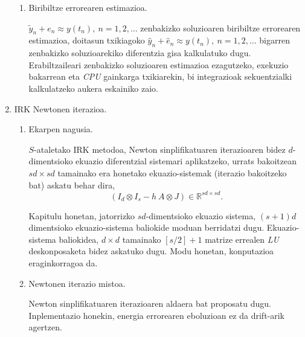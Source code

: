 \begin{enumerate}
\begin{enumerate}
\item Biribiltze errorearen estimazioa.

$\tilde{y}_n+e_n \approx y(t_n), \ n=1,2,\dots$ zenbakizko soluzioaren  biribiltze errorearen estimazioa, doitasun txikiagoko $\hat{y}_n+\hat{e}_n \approx y(t_n), \ n=1,2,\dots$ bigarren zenbakizko soluzioarekiko  diferentzia gisa kalkulatuko dugu.
Erabiltzaileari zenbakizko soluzioaren estimazioa ezagutzeko, exekuzio bakarrean  eta \emph{CPU} gainkarga txikiarekin, bi integrazioak sekuentzialki kalkulatzeko aukera eskainiko zaio. 

\end{enumerate}


\item IRK Newtonen iterazioa.

\begin{enumerate}
\item Ekarpen nagusia.

$S$-ataletako IRK metodoa,  Newton sinplifikatuaren iterazioaren bidez $d$-dimentsioko ekuazio diferentzial  sistemari aplikatzeko, urrats bakoitzean $sd \times sd$ tamainako era honetako ekuazio-sistemak (iterazio bakoitzeko bat) askatu behar dira,
\begin{equation*}
(I_d \otimes I_s- h \ A \otimes J) \in \mathbb{R}^{sd \times sd}.
\end{equation*} 

Kapitulu honetan, jatorrizko $sd$-dimentsioko ekuazio sistema, $(s+1)d$ dimentsioko ekuazio-sistema baliokide moduan berridatzi dugu. Ekuazio-sistema baliokidea,  $d \times d$ tamainako $[s/2]+1$ matrize errealen \emph{LU} deskonposaketa bidez askatuko dugu. Modu honetan, konputazioa eraginkorragoa da.



\item Newtonen iterazio mistoa.

Newton sinplifikatuaren iterazioaren aldaera bat proposatu dugu. Inplementazio honekin, energia errorearen eboluzioan ez da drift-arik agertzen. 




\end{enumerate}
  


\end{enumerate}

